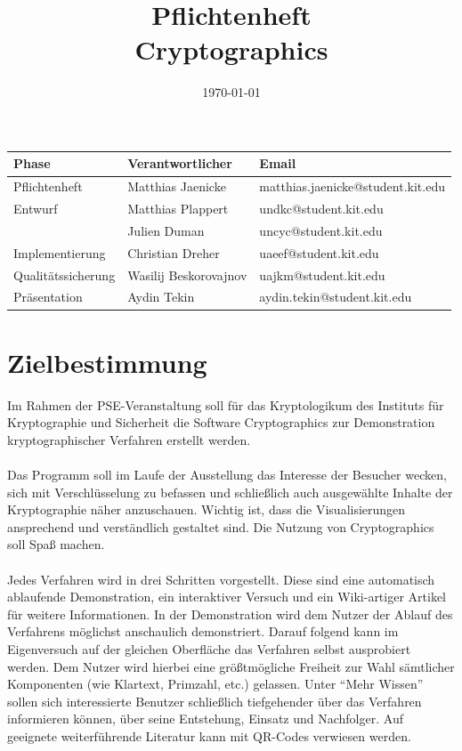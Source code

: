 \documentclass{article}
\title{\textbf{Pflichtenheft} \\ Cryptographics}
\author{}
\date{\today}
\begin{document}
\maketitle
\begin{table}[b]
  \begin{tabular}{| l | l | l |}
    \hline
    \textbf{Phase} & \textbf{Verantwortlicher} & \textbf{Email} \\ \hline
    Pflichtenheft & Matthias Jaenicke & matthias.jaenicke@student.kit.edu \\ \hline
    Entwurf & Matthias Plappert & undkc@student.kit.edu \\
            & Julien Duman & uncyc@student.kit.edu \\ \hline
    Implementierung & Christian Dreher & uaeef@student.kit.edu \\ \hline
    Qualitätssicherung & Wasilij Beskorovajnov & uajkm@student.kit.edu \\ \hline
    Präsentation & Aydin Tekin & aydin.tekin@student.kit.edu \\ \hline
    \end{tabular}
\end{table}
\newpage


\tableofcontents
\newpage

\section{Zielbestimmung}

Im Rahmen der \gls{PSE}-Veranstaltung soll für das \gls{Kryptologikum} des Instituts für
Kryptographie und Sicherheit die Software \gls{Cryptographics} zur
Demonstration kryptographischer Verfahren erstellt werden. \\
\\
Das Programm soll im Laufe der Ausstellung das Interesse der Besucher wecken, sich mit Verschlüsselung zu befassen und schließlich auch ausgewählte Inhalte der Kryptographie näher anzuschauen. Wichtig ist, dass die Visualisierungen ansprechend und verständlich gestaltet sind. Die Nutzung von \gls{Cryptographics} soll Spaß machen. \\
\\
Jedes Verfahren wird in drei Schritten vorgestellt. Diese sind eine automatisch ablaufende Demonstration, ein interaktiver Versuch und ein Wiki-artiger Artikel für weitere Informationen.
In der Demonstration wird dem Nutzer der Ablauf des Verfahrens möglichst anschaulich demonstriert. Darauf folgend kann im Eigenversuch auf der gleichen Oberfläche das Verfahren selbst ausprobiert werden. Dem Nutzer wird hierbei eine größtmögliche Freiheit zur Wahl sämtlicher Komponenten (wie Klartext, Primzahl, etc.) gelassen. Unter ``Mehr Wissen'' sollen sich interessierte Benutzer schließlich tiefgehender über das Verfahren informieren können, über seine Entstehung, Einsatz und Nachfolger. Auf geeignete weiterführende Literatur kann mit QR-Codes verwiesen werden. \\
\end{document}
